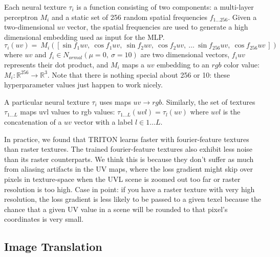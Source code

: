 \documentclass{article}
\begin{document}
	Each neural texture $\tau_i$ is a function consisting of two components: a multi-layer perceptron $M_i$ and a static set of 256 random spatial frequencies $f_{1...256}$. 
	Given a two-dimensional $uv$ vector, the spatial frequencies are used to generate a high dimensional embedding used as input for the MLP.
	\begin{equation}
			\tau_i(uv) = 
			\
			M_i\left(\left[
				\sin f_1 uv, \ 
				\cos f_1 uv, \ 
				\sin f_2 uv, \ 
				\cos f_2 uv, \ 
				\dots \ 
				\sin f_{256} uv, \ 
				\cos f_{256} uv \ 
			\right]\right)
	\end{equation}
	where $uv$ and $f_i \in N_{ormal}(\mu=0,\ \sigma=10)$ are two dimensional vectors,
	 $f_i uv$ represents their dot product, 
	 and $M_i$ maps a $uv$ embedding to an $rgb$ color value:
	 $M_i: \mathbb{R}^{256} \rightarrow \mathbb{R}^3$.
	Note that there is nothing special about 256 or 10: these hyperparameter values just happen to work nicely.
	
	A particular neural texture $\tau_i$ uses maps $uv \rightarrow rgb$. Similarly, the set of textures $\tau_{1\dots L}$ maps uvl values to rgb values: $\tau_{1\dots L}(uvl)=\tau_l(uv)$ where $uvl$ is the concatenation of a $uv$ vector with a label $l \in 1\dots L$.
	
	In practice, we found that TRITON learns faster with fourier-feature textures than raster textures. The trained fourier-feature textures also exhibit less noise than its raster counterparts. We think this is because they don't suffer as much from aliasing artifacts in the UV maps, where the loss gradient might skip over pixels in texture-space when the UVL scene is zoomed out too far or raster resolution is too high. Case in point: if you have a raster texture with very high resolution, the loss gradient is less likely to be passed to a given texel because the chance that a given UV value in a scene will be rounded to that pixel's coordinates is very small.




\subsection{Image Translation}

\newcommand{\Tab}{T_{A\rightarrow B}}
\newcommand{\Tba}{T_{B\rightarrow A}}
\newcommand{\pih}{\hat{\pi}}
\newcommand{\sh}{\hat{s}}
\newcommand{\ph}{\hat{p}}
\newcommand{\pis}{\pi,s} %
\newcommand{\pish}{\pih,\sh} %
\newcommand{\ppis}{(\pis)} %
\newcommand{\ppish}{(\pish)} %
\end{document}
